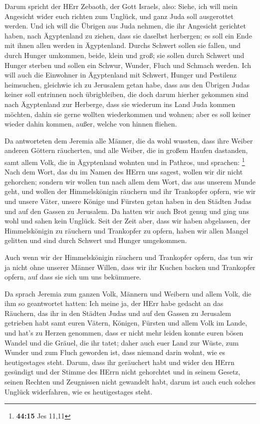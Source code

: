  Darum spricht der HErr Zebaoth, der Gott Israels, also:
Siehe, ich will mein Angesicht wider euch richten zum Unglück, und ganz
Juda soll ausgerottet werden.  Und ich will die Übrigen aus
Juda nehmen, die ihr Angesicht gerichtet haben, nach Ägyptenland zu
ziehen, dass sie daselbst herbergen; es soll ein Ende mit ihnen allen
werden in Ägyptenland. Durchs Schwert sollen sie fallen, und durch
Hunger umkommen, beide, klein und groß; sie sollen durch Schwert und
Hunger sterben und sollen ein Schwur, Wunder, Fluch und Schmach werden.
 Ich will auch die Einwohner in Ägyptenland mit Schwert,
Hunger und Pestilenz heimsuchen, gleichwie ich zu Jerusalem getan habe,
 dass aus den Übrigen Judas keiner soll entrinnen noch
übrigbleiben, die doch darum hierher gekommen sind nach Ägyptenland zur
Herberge, dass sie wiederum ins Land Juda kommen möchten, dahin sie
gerne wollten wiederkommen und wohnen; aber es soll keiner wieder dahin
kommen, außer, welche von hinnen fliehen.

 Da antworteten dem Jeremia alle Männer, die da wohl
wussten, dass ihre Weiber anderen Göttern räucherten, und alle Weiber,
die in großem Haufen dastanden, samt allem Volk, die in Ägyptenland
wohnten und in Pathros, und sprachen: \footnote{\textbf{44:15} Jes 11,11}
 Nach dem Wort, das du im Namen des HErrn uns sagest,
wollen wir dir nicht gehorchen;  sondern wir wollen tun
nach allem dem Wort, das aus unserem Munde geht, und wollen der
Himmelskönigin räuchern und ihr Trankopfer opfern, wie wir und unsere
Väter, unsere Könige und Fürsten getan haben in den Städten Judas und
auf den Gassen zu Jerusalem. Da hatten wir auch Brot genug und ging uns
wohl und sahen kein Unglück.  Seit der Zeit aber, dass wir
haben abgelassen, der Himmelskönigin zu räuchern und Trankopfer zu
opfern, haben wir allen Mangel gelitten und sind durch Schwert und
Hunger umgekommen.

 Auch wenn wir der Himmelskönigin räuchern und Trankopfer
opfern, das tun wir ja nicht ohne unserer Männer Willen, dass wir ihr
Kuchen backen und Trankopfer opfern, auf dass sie sich um uns bekümmere.

 Da sprach Jeremia zum ganzen Volk, Männern und Weibern und
allem Volk, die ihm so geantwortet hatten:  Ich meine ja,
der HErr habe gedacht an das Räuchern, das ihr in den Städten Judas und
auf den Gassen zu Jerusalem getrieben habt samt euren Vätern, Königen,
Fürsten und allem Volk im Lande, und hat's zu Herzen genommen,
 dass er nicht mehr leiden konnte euren bösen Wandel und
die Gräuel, die ihr tatet; daher auch euer Land zur Wüste, zum Wunder
und zum Fluch geworden ist, dass niemand darin wohnt, wie es
heutigestages steht.  Darum, dass ihr geräuchert habt und
wider den HErrn gesündigt und der Stimme des HErrn nicht gehorchtet und
in seinem Gesetz, seinen Rechten und Zeugnissen nicht gewandelt habt,
darum ist auch euch solches Unglück widerfahren, wie es heutigestages
steht.

